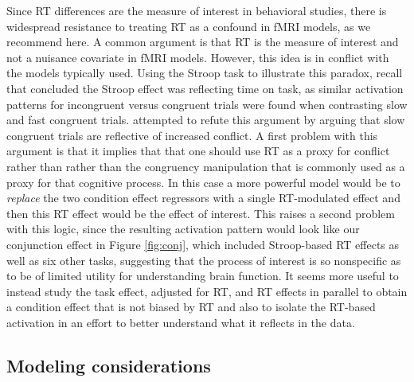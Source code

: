 \documentclass[titlepage,12pt] {article}
\begin{document}
Since RT differences are the measure of interest in behavioral studies, there is widespread resistance to treating RT as a confound in fMRI models, as we recommend here.  A common argument is that RT is the measure of interest and not a nuisance covariate in fMRI models.  However, this idea is in conflict with the models typically used.  Using the Stroop task to illustrate this paradox, recall that \citet{grinband_dorsal_2011} concluded the Stroop effect was reflecting time on task, as similar activation patterns for incongruent versus congruent trials were found when contrasting slow and fast congruent trials.  \citet{yeung_errors_2011} attempted to refute this argument by arguing that slow congruent trials are reflective of increased conflict.  A first problem with this argument is that it implies that that one should use RT as a proxy for conflict rather than rather than the congruency manipulation that is commonly used as a proxy for that cognitive process.   In this case a more powerful model would be to \emph{replace} the two condition effect regressors  with a single RT-modulated effect and then this RT effect would be the effect of interest.  This raises a second problem with this logic, since the resulting activation pattern would look like our conjunction effect in Figure \ref{fig:conj}, which included Stroop-based RT effects as well as six other tasks, suggesting that the process of interest is so nonspecific as to be of limited utility for understanding brain function.   It seems more useful to instead study the task effect, adjusted for RT, and RT effects in parallel to obtain a condition effect that is not biased by RT and also to isolate the RT-based activation in an effort to better understand what it reflects in the data. 

\subsection*{Modeling considerations}
\end{document}
